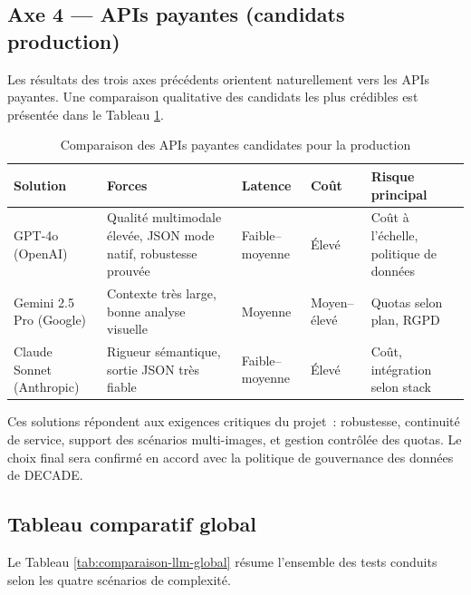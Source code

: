 \subsection{Axe 4 — APIs payantes (candidats production)}
\label{sec:apis-payantes}

Les résultats des trois axes précédents orientent naturellement vers les APIs payantes. Une comparaison qualitative des candidats les plus crédibles est présentée dans le Tableau \ref{tab:comparaison-payant}.

\begin{table}[H]
  \centering
  \caption{Comparaison des APIs payantes candidates pour la production}
  \label{tab:comparaison-payant}
  \begin{tabular}{|p{2.5cm}|p{3.5cm}|p{2.0cm}|p{2.0cm}|p{3.0cm}|}
    \hline
    \textbf{Solution} & \textbf{Forces} & \textbf{Latence} & \textbf{Coût} & \textbf{Risque principal} \\
    \hline
    GPT-4o (OpenAI) & Qualité multimodale élevée, JSON mode natif, robustesse prouvée & Faible–moyenne & Élevé & Coût à l'échelle, politique de données \\
    \hline
    Gemini 2.5 Pro (Google) & Contexte très large, bonne analyse visuelle & Moyenne & Moyen–élevé & Quotas selon plan, RGPD \\
    \hline
    Claude Sonnet (Anthropic) & Rigueur sémantique, sortie JSON très fiable & Faible–moyenne & Élevé & Coût, intégration selon stack \\
    \hline
  \end{tabular}
\end{table}

Ces solutions répondent aux exigences critiques du projet~: robustesse, continuité de service, support des scénarios multi-images, et gestion contrôlée des quotas. Le choix final sera confirmé en accord avec la politique de gouvernance des données de DECADE.

\subsection{Tableau comparatif global}
Le Tableau \ref{tab:comparaison-llm-global} résume l'ensemble des tests conduits selon les quatre scénarios de complexité.

